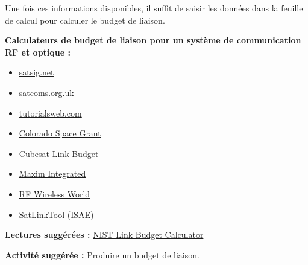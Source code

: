 Une fois ces informations disponibles, il suffit de saisir les données dans la feuille de calcul pour calculer le budget de liaison.

\medskip
\noindent \textbf{Calculateurs de budget de liaison pour un système de communication RF et optique :}
\begin{itemize}
    \item \href{https://www.satsig.net/linkbugt.htm}{satsig.net}
    \item \href{http://www.satcoms.org.uk/satellite-link-budget-calculator.asp}{satcoms.org.uk}
    \item \href{https://www.tutorialsweb.com/satcom/satellite-link-budget-calculator.htm}{tutorialsweb.com}
    \item \href{https://spacegrant.colorado.edu/COSGC_Projects/co3sat/downloads/CS1-COM100.03\%20AMSAT\%20IARU\%20Link\%20Budget.xls}{Colorado Space Grant}
    \item \href{https://cedarweb.vsp.ucar.edu/wiki/images/7/75/Cubesat_Link-Budget.xls}{Cubesat Link Budget}
    \item \href{https://www.maximintegrated.com/content/dam/files/design/tools/tech-docs/5142/AN5142-link-budget.xls}{Maxim Integrated}
    \item \href{https://www.rfwireless-world.com/downloads/RF-Link-Budget.xlsx}{RF Wireless World}
    \item \href{https://sourceforge.isae.fr/projects/satlinktool-a-tool-for-analysing-geo-satcom/wiki/Link_Budget}{SatLinkTool (ISAE)}
\end{itemize}
\noindent \textbf{Lectures suggérées :} 
\href{http://rfic.eecs.berkeley.edu/~niknejad/ee242/pdf-lock/NIST_LinkBudgetCalc_2_4_konglk.xls}{NIST Link Budget Calculator}

\medskip
\noindent \textbf{Activité suggérée :} 
Produire un budget de liaison.
